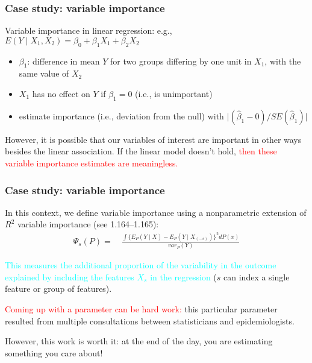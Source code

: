 \documentclass[12pt, 
hyperref={colorlinks=true, linkcolor=blue, urlcolor=cyan},dvipsnames]{beamer}
\begin{document}
\begin{frame}
\frametitle{Case study: variable importance}
Variable importance in linear regression: e.g., $E(Y \mid X_1, X_2) = \beta_0 + \beta_1 X_1 + \beta_2 X_2$
\begin{itemize}
\item $\beta_1$: difference in mean $Y$ for two groups differing by one unit in $X_1$, with the same value of $X_2$
\item $X_1$ has no effect on $Y$ if $\beta_1 = 0$ (i.e., is unimportant)
\item estimate importance (i.e., deviation from the null) with $\lvert (\hat{\beta}_1 - 0)/SE(\hat{\beta}_1) \rvert$
\end{itemize}

However, it is possible that our variables of interest are important in other ways besides the linear association. If the linear model doesn't hold, \textcolor{red}{then these variable importance estimates are meaningless.}
\end{frame}


\begin{frame}
\frametitle{Case study: variable importance}
In this context, we define variable importance using a nonparametric extension of $R^2$ variable importance (see 1.164--1.165):
\begin{align*}
\Psi_s(P) = &\ \frac{\int \{E_P(Y \mid X) - E_P(Y \mid X_{(-s)})\}^2 dP(x)}{var_P(Y)}
\end{align*}

\textcolor{cyan}{This measures the additional proportion of the variability in the outcome explained by including the features $X_s$ in the regression} ($s$ can index a single feature or group of features).

\textcolor{red}{Coming up with a parameter can be hard work:} this particular parameter resulted from multiple consultations between statisticians and epidemiologists.

However, this work is worth it: at the end of the day, you are estimating something you care about!
\end{frame}
\end{document}
